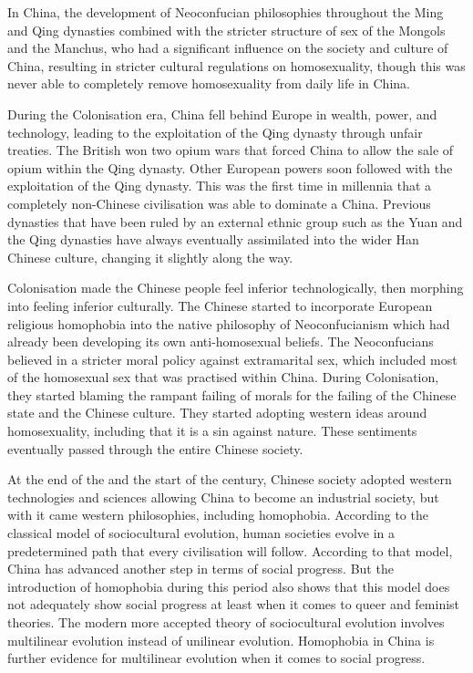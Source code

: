 In China, the development of Neoconfucian philosophies throughout the Ming and Qing dynasties combined with the stricter structure of sex of the Mongols and the Manchus, who had a significant influence on the society and culture of China, resulting in stricter cultural regulations on homosexuality, though this was never able to completely remove homosexuality from daily life in China.

During the Colonisation era, China fell behind Europe in wealth, power, and technology, leading to the exploitation of the Qing dynasty through unfair treaties. The British won two opium wars that forced China to allow the sale of opium within the Qing dynasty. Other European powers soon followed with the exploitation of the Qing dynasty. This was the first time in millennia that a completely non-Chinese civilisation was able to dominate a China. Previous dynasties that have been ruled by an external ethnic group such as the Yuan and the Qing dynasties have always eventually assimilated into the wider Han Chinese culture, changing it slightly along the way.

Colonisation made the Chinese people feel inferior technologically, then morphing into feeling inferior culturally. The Chinese started to incorporate European religious homophobia into the native philosophy of Neoconfucianism which had already been developing its own anti-homosexual beliefs. The Neoconfucians believed in a stricter moral policy against extramarital sex, which included most of the homosexual sex that was practised within China. During Colonisation, they started blaming the rampant failing of morals for the failing of the Chinese state and the Chinese culture. They started adopting western ideas around homosexuality, including that it is a sin against nature. These sentiments eventually passed through the entire Chinese society.

At the end of the  and the start of the  century, Chinese society adopted western technologies and sciences allowing China to become an industrial society, but with it came western philosophies, including homophobia. According to the classical model of sociocultural evolution, human societies evolve in a predetermined path that every civilisation will follow. According to that model, China has advanced another step in terms of social progress. But the introduction of homophobia during this period also shows that this model does not adequately show social progress at least when it comes to queer and feminist theories. The modern more accepted theory of sociocultural evolution involves multilinear evolution instead of unilinear evolution. Homophobia in China is further evidence for multilinear evolution when it comes to social progress.

